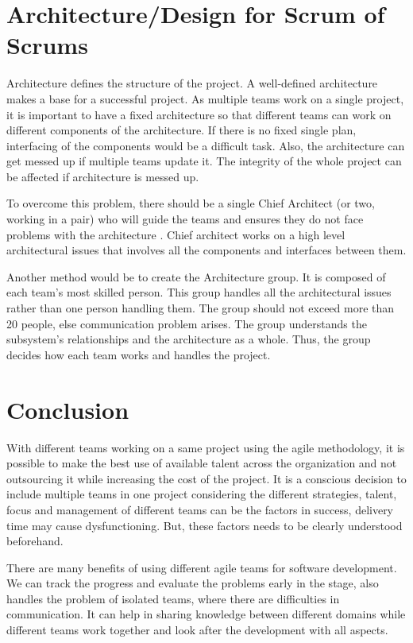 \documentclass[sigconf]{acmart}
\begin{document}
\section{Architecture/Design for Scrum of Scrums }
Architecture defines the structure of the project. A well-defined architecture makes a base for a successful project. As multiple teams work on a single project, it is important to have a fixed architecture so that different teams can work on different components of the architecture. If there is no fixed single plan, interfacing of the components would be a difficult task. Also, the architecture can get messed up if multiple teams update it. The integrity of the whole project can be affected if architecture is messed up.


To overcome this problem, there should be a single Chief Architect (or two, working in a pair) who will guide the teams and ensures they do not face problems with the architecture \cite{HenrikK}. Chief architect works on a high level architectural issues that involves all the components and interfaces between them. 


Another method would be to create the Architecture group. It is composed of each team's most skilled person. This group handles all the architectural issues rather than one person handling them. The group should not exceed more than 20 people, else communication problem arises. The group understands the subsystem's relationships and the architecture as a whole. Thus, the group decides how each team works and handles the project. 


\section{Conclusion}
With different teams working on a same project using the agile methodology, it is possible to make the best use of available talent across the organization and not outsourcing it while increasing the cost of the project. It is a conscious decision to include multiple teams in one project considering the different strategies, talent, focus and management of different teams can be the factors in success, delivery time may cause dysfunctioning. But, these factors needs to be clearly understood beforehand.

There are many benefits of using different agile teams for software development. We can track the progress and evaluate the problems early in the stage, also handles the problem of isolated teams, where there are difficulties in communication. It can help in sharing knowledge between different domains while different teams work together and look after the development with all aspects.
\end{document}
